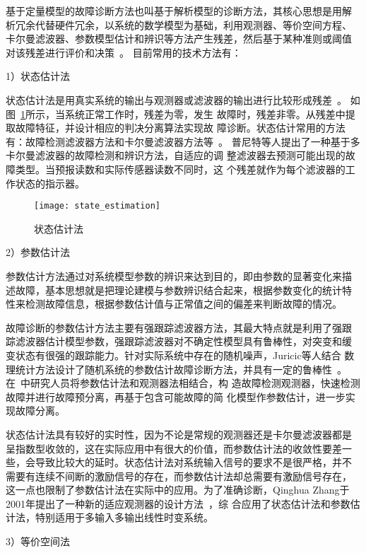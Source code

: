 基于定量模型的故障诊断方法也叫基于解析模型的诊断方法，其核心思想是用解
析冗余代替硬件冗余，以系统的数学模型为基础，利用观测器、等价空间方程、
卡尔曼滤波器、参数模型估计和辨识等方法产生残差，然后基于某种准则或阈值
对该残差进行评价和决策~\cite{raghuraj2008variable, twellmann2008model, rodrigues2008fault}。
目前常用的技术方法有：

1）状态估计法

状态估计法是用真实系统的输出与观测器或滤波器的输出进行比较形成残差~\cite{gao2006kalman, qian2001digital, piatyszek2000fault}。
如图~\ref{fig:state_estimation}所示，当系统正常工作时，残差为零，发生
故障时，残差非零。从残差中提取故障特征，并设计相应的判决分离算法实现故
障诊断。状态估计常用的方法有：故障检测滤波器方法和卡尔曼滤波器方法等~\cite{goel2000fault}。
普尼特等人提出了一种基于多卡尔曼滤波器的故障检测和辨识方法，自适应的调
整滤波器去预测可能出现的故障类型。当预报读数和实际传感器读数不同时，这
个残差就作为每个滤波器的工作状态的指示器。
\begin{figure}[ht]
  \centering
  \texttt{[image: state\_estimation]}
  \caption{状态估计法}
  \label{fig:state_estimation}
\end{figure}

2）参数估计法

参数估计方法通过对系统模型参数的辨识来达到目的，即由参数的显著变化来描
述故障，基本思想就是把理论建模与参数辨识结合起来，根据参数变化的统计特
性来检测故障信息，根据参数估计值与正常值之间的偏差来判断故障的情况。

故障诊断的参数估计方法主要有强跟踪滤波器方法，其最大特点就是利用了强跟
踪滤波器估计模型参数，强跟踪滤波器对不确定性模型具有鲁棒性，对突变和缓
变状态有很强的跟踪能力。针对实际系统中存在的随机噪声，Juricic等人结合
数理统计方法设计了随机系统的参数估计故障诊断方法，并具有一定的鲁棒性~\cite{jurivcic2002robust}。
在~中研究人员将参数估计法和观测器法相结合，构
造故障检测观测器，快速检测故障并进行故障预分离，再基于包含可能故障的简
化模型作参数估计，进一步实现故障分离。

状态估计法具有较好的实时性，因为不论是常规的观测器还是卡尔曼滤波器都是
呈指数型收敛的，这在实际应用中有很大的价值，而参数估计法的收敛性要差一
些，会导致比较大的延时。状态估计法对系统输入信号的要求不是很严格，并不
需要有连续不间断的激励信号的存在，而参数估计法却总需要有激励信号存在，
这一点也限制了参数估计法在实际中的应用。为了准确诊断，Qinghua Zhang于
2001年提出了一种新的适应观测器的设计方法~\cite{zhang2002adaptive}，综
合应用了状态估计法和参数估计法，特别适用于多输入多输出线性时变系统。 

3）等价空间法

